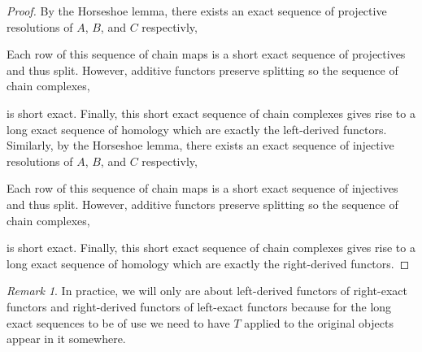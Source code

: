 \documentclass[12pt]{article}
\theoremstyle{remark}
\newtheorem*{remark}{Remark}
\theoremstyle{definition}
\begin{document}
\begin{proof}
By the Horseshoe lemma, there exists an exact sequence of projective resolutions of $A$, $B$, and $C$ respectivly,
\begin{center}
\end{center}
Each row of this sequence of chain maps is a short exact sequence of projectives and thus split. However, additive functors preserve splitting so the sequence of chain complexes,
\begin{center}
\end{center}
is short exact. Finally, this short exact sequence of chain complexes gives rise to a long exact sequence of homology which are exactly the left-derived functors.
\bigskip\\
Similarly, by the Horseshoe lemma, there exists an exact sequence of injective resolutions of $A$, $B$, and $C$ respectivly,
\begin{center}
\end{center}
Each row of this sequence of chain maps is a short exact sequence of injectives and thus split. However, additive functors preserve splitting so the sequence of chain complexes,
\begin{center}
\end{center}
is short exact. Finally, this short exact sequence of chain complexes gives rise to a long exact sequence of homology which are exactly the right-derived functors.
\end{proof}

\begin{remark}
In practice, we will only are about left-derived functors of right-exact functors and right-derived functors of left-exact functors because for the long exact sequences to be of use we need to have $T$ applied to the original objects appear in it somewhere. 
\end{remark}
\end{document}
